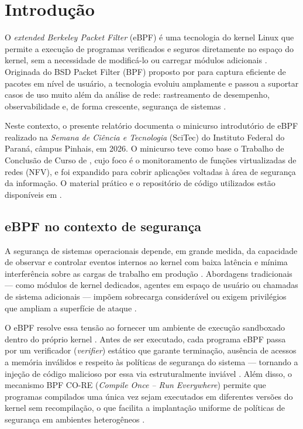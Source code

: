\chapter{Introdução}
\label{cap:introducao-seguranca}

O \textit{extended Berkeley Packet Filter} (eBPF) é uma tecnologia do kernel Linux que
permite a execução de programas verificados e seguros diretamente no espaço do kernel,
sem a necessidade de modificá-lo ou carregar módulos adicionais
\cite{linuxkernel2024}.
Originada do BSD Packet Filter (BPF) proposto por  para
captura eficiente de pacotes em nível de usuário, a tecnologia evoluiu amplamente
e passou a suportar casos de uso muito além da análise de rede: rastreamento de
desempenho, observabilidade e, de forma crescente, segurança de sistemas
\cite{gregg2019}.

Neste contexto, o presente relatório documenta o minicurso introdutório de eBPF
realizado na \textit{Semana de Ciência e Tecnologia} (SciTec) do Instituto Federal
do Paraná, câmpus Pinhais, em 2026.
O minicurso teve como base o Trabalho de Conclusão de Curso de
, cujo foco é o monitoramento de funções virtualizadas de
redes (NFV), e foi expandido para cobrir aplicações voltadas à área de segurança
da informação.
O material prático e o repositório de código utilizados estão disponíveis em
.

\section{eBPF no contexto de segurança}

A segurança de sistemas operacionais depende, em grande medida, da capacidade de
observar e controlar eventos internos ao kernel com baixa latência e mínima
interferência sobre as cargas de trabalho em produção
\cite{beyer2016}.
Abordagens tradicionais — como módulos de kernel dedicados, agentes em espaço de
usuário ou chamadas de sistema adicionais — impõem sobrecarga considerável ou
exigem privilégios que ampliam a superfície de ataque
\cite{cassagnes2020}.

O eBPF resolve essa tensão ao fornecer um ambiente de execução sandboxado dentro do
próprio kernel \cite{linuxkernel2024}.
Antes de ser executado, cada programa eBPF passa por um verificador (\textit{verifier})
estático que garante terminação, ausência de acessos a memória inválidos e respeito
às políticas de segurança do sistema — tornando a injeção de código malicioso por
essa via estruturalmente inviável \cite{gregg2019}.
Além disso, o mecanismo BPF CO-RE (\textit{Compile Once -- Run Everywhere}) permite
que programas compilados uma única vez sejam executados em diferentes versões do
kernel sem recompilação, o que facilita a implantação uniforme de políticas de
segurança em ambientes heterogêneos \cite{nakryiko2020}.

